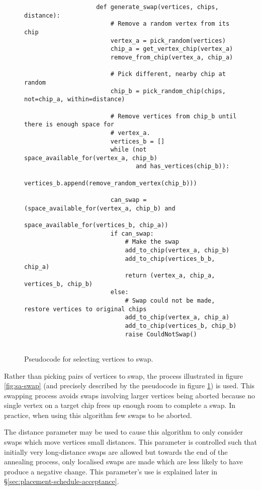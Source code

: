 			\begin{figure}
				\begin{verbatim}
					def generate_swap(vertices, chips, distance):
						# Remove a random vertex from its chip
						vertex_a = pick_random(vertices)
						chip_a = get_vertex_chip(vertex_a)
						remove_from_chip(vertex_a, chip_a)
						
						# Pick different, nearby chip at random
						chip_b = pick_random_chip(chips, not=chip_a, within=distance)
						
						# Remove vertices from chip_b until there is enough space for
						# vertex_a.
						vertices_b = []
						while (not space_available_for(vertex_a, chip_b)
						       and has_vertices(chip_b)):
							vertices_b.append(remove_random_vertex(chip_b)))
						
						can_swap = (space_available_for(vertex_a, chip_b) and
						            space_available_for(vertices_b, chip_a))
						if can_swap:
							# Make the swap
							add_to_chip(vertex_a, chip_b)
							add_to_chip(vertices_b_b, chip_a)
							return (vertex_a, chip_a, vertices_b, chip_b)
						else:
							# Swap could not be made, restore vertices to original chips
							add_to_chip(vertex_a, chip_a)
							add_to_chip(vertices_b, chip_b)
							raise CouldNotSwap()
						
				\end{verbatim}
			
				\caption{Pseudocode for selecting vertices to swap.}
				\label{fig:swap-pseudocode}
			\end{figure}
			
			Rather than picking pairs of vertices to swap, the process illustrated in
			figure \ref{fig:sa-swap} (and precisely described by the pseudocode in
			figure \ref{fig:swap-pseudocode}) is used. This swapping process avoids
			swaps involving larger vertices being aborted because no single vertex on
			a target chip frees up enough room to complete a swap. In practice, when
			using this algorithm few swaps to be aborted.
			
			The distance parameter may be used to cause this algorithm to only
			consider swaps which move vertices small distances. This parameter is
			controlled such that initially very long-distance swaps are allowed but
			towards the end of the annealing process, only localised swaps are made
			which are less likely to have produce a negative change. This parameter's
			use is explained later in \S\ref{sec:placement-schedule-acceptance}.
		
